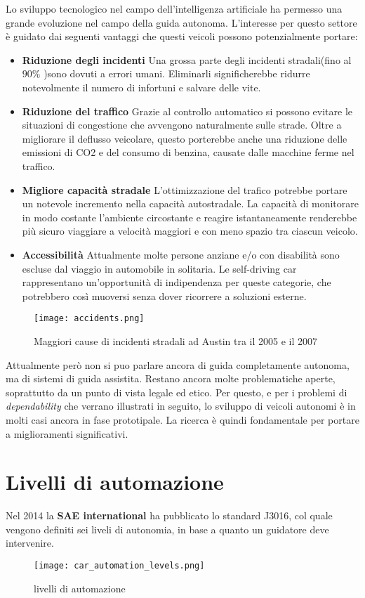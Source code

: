 Lo sviluppo tecnologico nel campo dell'intelligenza artificiale ha permesso una grande evoluzione nel campo della guida autonoma. L'interesse per questo 
settore è guidato dai seguenti vantaggi che questi veicoli possono potenzialmente portare\cite{advantages}:
\begin{itemize}
    \item \textbf{Riduzione degli incidenti} Una grossa parte degli incidenti stradali(fino al $90\%$ )sono dovuti a errori umani. Eliminarli
    significherebbe ridurre notevolmente il numero di infortuni e salvare delle vite.
    \item \textbf{Riduzione del traffico} Grazie al controllo automatico si possono evitare le situazioni di congestione che avvengono naturalmente sulle strade.
    Oltre a migliorare il deflusso veicolare, questo porterebbe anche  una riduzione delle emissioni di CO2 e del consumo di benzina, causate dalle macchine ferme nel traffico.
    \item \textbf{Migliore capacità stradale} L'ottimizzazione del trafico potrebbe portare un notevole incremento nella capacità autostradale. La capacità
    di monitorare in modo costante l'ambiente circostante e reagire istantaneamente renderebbe più sicuro viaggiare a velocità maggiori e con meno spazio tra ciascun veicolo.
    \item \textbf{Accessibilità} Attualmente  molte persone anziane  e/o con disabilità sono escluse dal viaggio in automobile in solitaria. Le self-driving car rappresentano un'opportunità
    di indipendenza per queste categorie, che potrebbero così muoversi senza dover ricorrere a soluzioni esterne.
\end{itemize}
\begin{figure}
    \texttt{[image: accidents.png]}
    \caption{Maggiori cause di incidenti stradali ad Austin tra il 2005 e il 2007\cite{accid}}
    \label{fig:accid}
\end{figure}
Attualmente però non si puo parlare ancora di guida completamente autonoma, ma di sistemi di guida assistita. Restano ancora molte problematiche aperte, soprattutto 
da un punto di vista legale\cite{legal} ed etico\cite{Lin2015}. Per questo, e per i problemi di \emph{dependability} che verrano illustrati in seguito, lo sviluppo
di veicoli autonomi è in molti casi ancora in fase prototipale. La ricerca è quindi fondamentale per portare a miglioramenti significativi.
\section{Livelli di automazione}
Nel 2014 la \textbf{SAE international} ha pubblicato lo standard J3016, col quale vengono definiti sei liveli di autonomia, in base a quanto un guidatore deve intervenire.
\begin{figure}
    \texttt{[image: car\_automation\_levels.png]}
    \caption{livelli di automazione\cite{car}}
    \label{fig:adaslevel}
\end{figure}
